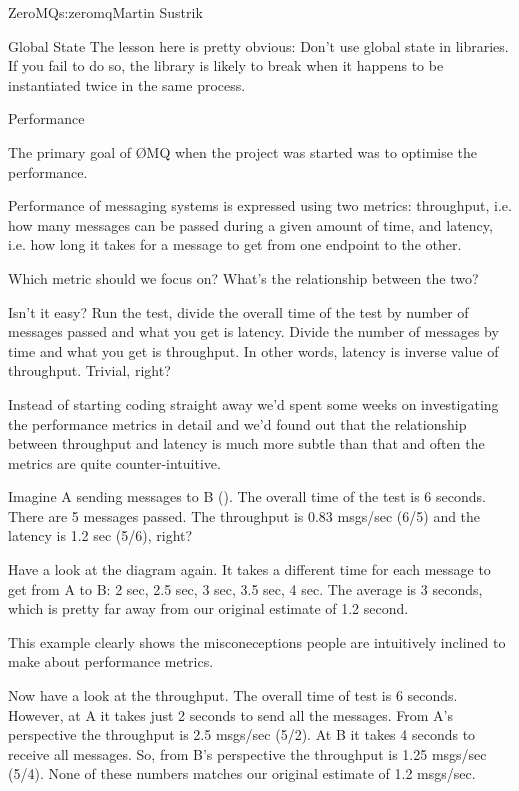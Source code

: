 \begin{aosachapter}{ZeroMQ}{s:zeromq}{Martin Sustrik}
\begin{aosasect1}{Global State}
The lesson here is pretty obvious: Don't use global state in
libraries. If you fail to do so, the library is likely to break when
it happens to be instantiated twice in the same process.

\end{aosasect1}

\begin{aosasect1}{Performance}

The primary goal of {\O}MQ when the project was started was to optimise
the performance.

Performance of messaging systems is expressed using two metrics:
throughput, i.e. how many messages can be passed during a given amount
of time, and latency, i.e. how long it takes for a message to get from
one endpoint to the other.

Which metric should we focus on? What's the relationship between the
two?

Isn't it easy? Run the test, divide the overall time of the test by
number of messages passed and what you get is latency. Divide the
number of messages by time and what you get is throughput. In other
words, latency is inverse value of throughput. Trivial, right?

Instead of starting coding straight away we'd spent some weeks on
investigating the performance metrics in detail and we'd found out
that the relationship between throughput and latency is much more
subtle than that and often the metrics are quite counter-intuitive.


Imagine A sending messages to B ().  The
overall time of the test is 6 seconds. There are 5 messages
passed. The throughput is 0.83 msgs/sec (6/5) and the latency is 1.2
sec (5/6), right?

Have a look at the diagram again. It takes a different time for each
message to get from A to B: 2 sec, 2.5 sec, 3 sec, 3.5 sec, 4 sec. The
average is 3 seconds, which is pretty far away from our original
estimate of 1.2 second.

This example clearly shows the misconeceptions people are intuitively
inclined to make about performance metrics.

Now have a look at the throughput. The overall time of test is 6
seconds. However, at A it takes just 2 seconds to send all the
messages. From A's perspective the throughput is 2.5 msgs/sec
(5/2). At B it takes 4 seconds to receive all messages. So, from B's
perspective the throughput is 1.25 msgs/sec (5/4). None of these
numbers matches our original estimate of 1.2 msgs/sec.


\end{aosasect1}
\end{aosachapter}
